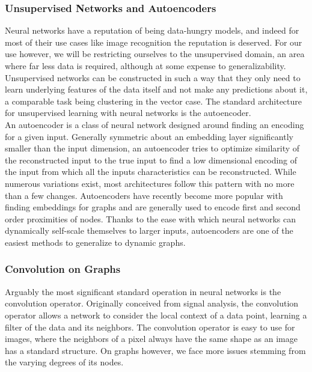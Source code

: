 \documentclass[12pt,twoside]{report}
\begin{document}
\subsubsection{Unsupervised Networks and Autoencoders}

Neural networks have a reputation of being data-hungry models, and indeed for most of their use cases like image recognition the reputation is deserved. For our use however, we will be restricting ourselves to the unsupervised domain, an area where far less data is required, although at some expense to generalizability. Unsupervised networks can be constructed in such a way that they only need to learn underlying features of the data itself and not make any predictions about it, a comparable task being clustering in the vector case. The standard architecture for unsupervised learning with neural networks is the autoencoder. \\

An autoencoder is a class of neural network designed around finding an encoding for a given input. Generally symmetric about an embedding layer significantly smaller than the input dimension, an autoencoder tries to optimize similarity of the reconstructed input to the true input to find a low dimensional encoding of the input from which all the inputs characteristics can be reconstructed. While numerous variations exist, most architectures follow this pattern with no more than a few changes. Autoencoders have recently become more popular with finding embeddings for graphs and are generally used to encode first and second order proximities of nodes. Thanks to the ease with which neural networks can dynamically self-scale themselves to larger inputs, autoencoders are one of the easiest methods to generalize to dynamic graphs. \\

\subsubsection{Convolution on Graphs}

Arguably the most significant standard operation in neural networks is the convolution operator. Originally conceived from signal analysis, the convolution operator allows a network to consider the local context of a data point, learning a filter of the data and its neighbors. The convolution operator is easy to use for images, where the neighbors of a pixel always have the same shape as an image has a standard structure.  On graphs however, we face more issues stemming from the varying degrees of its nodes. \\
\end{document}
